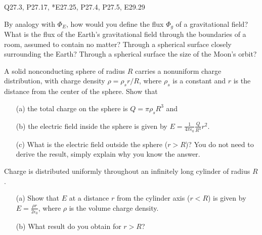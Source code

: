 \documentclass[11pt,letterpaper,boxed]{pset}
\begin{document}
    \begin{center}
    	 Q27.3, P27.17, *E27.25, P27.4, P27.5, E29.29
    \end{center}
    
    \begin{problem} [Q27.3]
    	By analogy with $\Phi_E$, how would you define the flux $\Phi_g$ of a gravitational field? What is the flux of the Earth's gravitational field through the boundaries of a room, assumed to contain no matter? Through a spherical surface closely surrounding the Earth? Through a spherical surface the size of the Moon's orbit?
    \end{problem}
    \newpage
    
    \begin{problem} [P27.17]
    	A solid nonconducting sphere of radius $R$ carries a nonuniform charge distribution, with charge density $\rho=\rho_sr/R$, where $\rho_s$ is a constant and $r$ is the distance from the center of the sphere. Show that
    	
    	\begin{itemize}
    	    \item [(a)] the total charge on the sphere is $Q=\pi\rho_sR^3$ and
    	    \item [(b)] the electric field inside the sphere is given by $E=\frac{1}{4\pi\epsilon_0}\frac{Q}{R^4}r^2$.
    	    \item [(c)] What is the electric field outside the sphere ($r>R$)? You do not need to derive the result, simply explain why you know the answer.
    	\end{itemize}
    \end{problem}
    \newpage
    
    \begin{problem} [*E27.25]
    	Charge is distributed uniformly throughout an infinitely long cylinder of radius $R$.
    	
    	\begin{itemize}
    	    \item [(a)] Show that $E$ at a distance $r$ from the cylinder axis ($r< R$) is given by $E = \frac{\rho r}{2\epsilon_0}$, where $\rho$ is the volume charge density.
    	    \item [(b)] What result do you obtain for $r>R$?
    	\end{itemize}
    \end{problem}
    \newpage
    
\end{document}
